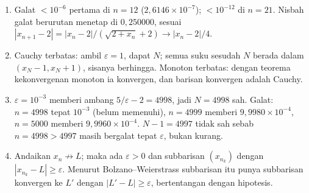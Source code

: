 \begin{enumerate}[label=\textbf{4.\arabic*}]
  \item Galat $<10^{-6}$ pertama di $n=12$ ($2{,}6146\times10^{-7}$); $<10^{-12}$
        di $n=21$. Nisbah galat berurutan menetap di $0{,}250000$, sesuai
        $|x_{n+1}-2|=|x_{n}-2|/(\sqrt{2+x_{n}}+2)\to|x_{n}-2|/4$.

  \item Cauchy terbatas: ambil $\varepsilon=1$, dapat $N$; semua suku sesudah $N$
        berada dalam $(x_{N}-1,x_{N}+1)$, sisanya berhingga. Monoton terbatas:
        dengan teorema kekonvergenan monoton ia konvergen, dan barisan konvergen
        adalah Cauchy.

  \item $\varepsilon=10^{-3}$ memberi ambang $5/\varepsilon-2=4998$, jadi
        $N=4998$ sah. Galat: $n=4998$ tepat $10^{-3}$ (belum memenuhi), $n=4999$
        memberi $9{,}9980\times10^{-4}$, $n=5000$ memberi $9{,}9960\times10^{-4}$.
        $N-1=4997$ tidak sah sebab $n=4998>4997$ masih bergalat tepat
        $\varepsilon$, bukan kurang.

  \item Andaikan $x_{n}\not\to L$; maka ada $\varepsilon>0$ dan subbarisan
        $(x_{n_{k}})$ dengan $|x_{n_{k}}-L|\ge\varepsilon$. Menurut
        Bolzano--Weierstrass subbarisan itu punya subbarisan konvergen ke $L'$ dengan
        $|L'-L|\ge\varepsilon$, bertentangan dengan hipotesis.
\end{enumerate}

